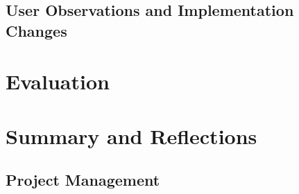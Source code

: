 \documentclass [11pt,a4paper]{article}
\begin{document}
\subsection{User Observations and Implementation Changes}
\label{sec:observations}



\section{Evaluation}
\label{sec:evaluation}

\section{Summary and Reflections}
\label{sec:summary}
\subsection{Project Management}
\label{sec:project_management_summary}


\end{document}
